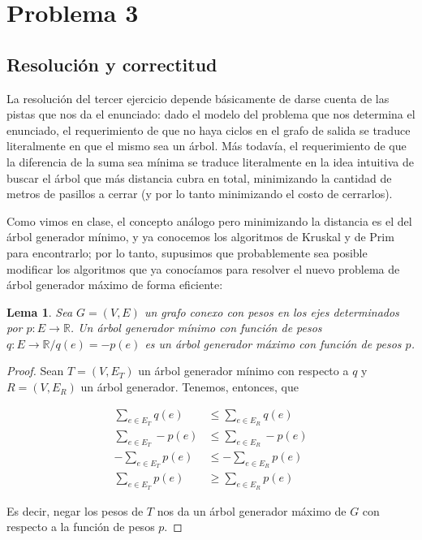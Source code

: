 \documentclass{article}
\newtheorem{lemma}{Lema}[theorem]
\theoremstyle{definition}
\theoremstyle{remark}
\begin{document}
\pagebreak

\section{Problema 3}

\subsection{Resolución y correctitud}

La resolución del tercer ejercicio depende básicamente de darse cuenta de las pistas que nos da el enunciado: dado el modelo del problema que nos determina el enunciado, el requerimiento de que no haya ciclos en el grafo de salida se traduce literalmente en que el mismo sea un árbol. Más todavía, el requerimiento de que la diferencia de la suma sea mínima se traduce literalmente en la idea intuitiva de buscar el árbol que más distancia cubra en total, minimizando la cantidad de metros de pasillos a cerrar (y por lo tanto minimizando el costo de cerrarlos).

Como vimos en clase, el concepto análogo pero minimizando la distancia es el del árbol generador mínimo, y ya conocemos los algoritmos de Kruskal y de Prim para encontrarlo; por lo tanto, supusimos que probablemente sea posible modificar los algoritmos que ya conocíamos para resolver el nuevo problema de árbol generador máximo de forma eficiente:

\begin{lemma}
Sea $G = (V, E)$ un grafo conexo con pesos en los ejes determinados por $p : E \to \mathbb{R}$. Un árbol generador mínimo con función de pesos $q : E \to \mathbb{R} / q(e) = -p(e)$ es un árbol generador máximo con función de pesos $p$.
\label{pr:agm}
\end{lemma}

\begin{proof}
Sean $T = (V, E_T)$ un árbol generador mínimo con respecto a $q$ y $R = (V, E_R)$ un árbol generador. Tenemos, entonces, que

\begin{align*}
\sum_{e \in E_T} q(e) &\leq \sum_{e \in E_R} q(e)\\
\sum_{e \in E_T} -p(e) &\leq \sum_{e \in E_R} -p(e)\\
-\sum_{e \in E_T} p(e) &\leq -\sum_{e \in E_R} p(e)\\
\sum_{e \in E_T} p(e) &\geq \sum_{e \in E_R} p(e)
\end{align*}

Es decir, negar los pesos de $T$ nos da un árbol generador máximo de $G$ con respecto a la función de pesos $p$.
\end{proof}
\end{document}
